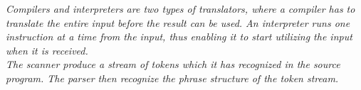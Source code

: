 \vspace{30pt}

\textit{Compilers and interpreters are two types of translators, where a compiler has to translate the entire input before the result can be used. An interpreter runs one instruction at a time from the input, thus enabling it to start utilizing the input when it is received.\\ \indent
The scanner produce a stream of tokens which it has recognized in the source program. The parser then recognize the phrase structure of the token stream.}